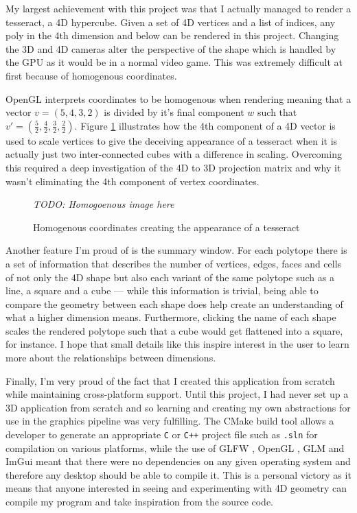 \documentclass[11pt, a4paper]{article}
\begin{document}
My largest achievement with this project was that I actually managed to render a tesseract, a 4D hypercube. Given a set of 4D vertices and a list of indices, any poly in the 4th dimension and below can be rendered in this project. Changing the 3D and 4D cameras alter the perspective of the shape which is handled by the GPU as it would be in a normal video game. This was extremely difficult at first because of homogenous coordinates.

OpenGL interprets coordinates to be homogenous when rendering \parencite{woo1999opengl} meaning that a vector $v = (5, 4, 3, 2)$ is divided by it's final component $w$ such that $v' = (\frac{5}{2}, \frac{4}{2}, \frac{3}{2}, \frac{2}{2})$. Figure \ref{fig:homogenous} illustrates how the 4th component of a 4D vector is used to scale vertices to give the deceiving appearance of a tesseract when it is actually just two inter-connected cubes with a difference in scaling. Overcoming this required a deep investigation of the 4D to 3D projection matrix and why it wasn't eliminating the 4th component of vertex coordinates.

\begin{figure}[!h]
  \centering
  \emph{TODO: Homogoenous image here}
  \caption{Homogenous coordinates creating the appearance of a tesseract}
  \label{fig:homogenous}
\end{figure}

Another feature I'm proud of is the summary window. For each polytope there is a set of information that describes the number of vertices, edges, faces and cells of not only the 4D shape but also each variant of the same polytope such as a line, a square and a cube --- while this information is trivial, being able to compare the geometry between each shape does help create an understanding of what a higher dimension means. Furthermore, clicking the name of each shape scales the rendered polytope such that a cube would get flattened into a square, for instance. I hope that small details like this inspire interest in the user to learn more about the relationships between dimensions.

Finally, I'm very proud of the fact that I created this application from scratch while maintaining cross-platform support. Until this project, I had never set up a 3D application from scratch and so learning and creating my own abstractions for use in the graphics pipeline was very fulfilling. The CMake build tool \parencite{cmake} allows a developer to generate an appropriate \texttt{C} or \texttt{C++} project file such as \texttt{.sln} for compilation on various platforms, while the use of GLFW \parencite{glfw}, OpenGL \parencite{opengl}, GLM \parencite{glm} and ImGui \parencite{imgui} meant that there were no dependencies on any given operating system and therefore any desktop should be able to compile it. This is a personal victory as it means that anyone interested in seeing and experimenting with 4D geometry can compile my program and take inspiration from the source code.
\end{document}
